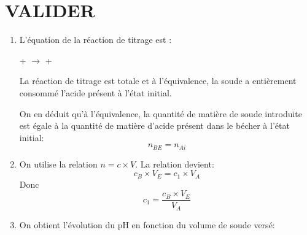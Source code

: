 \documentclass[a4paper,10pt]{article}
\begin{document}
\section{VALIDER}
\begin{enumerate}
    \item L'équation de la réaction de titrage est :
    \begin{center}
        + $\longrightarrow$  + 
    \end{center}
    La réaction de titrage est totale et à l'équivalence, la soude a entièrement consommé l'acide présent à l'état initial.
    
    On en déduit qu'à l'équivalence, la quantité de matière de soude introduite est égale à la quantité de matière d'acide présent dans le bécher à l'état initial:
    \[
        n_{BE}=n_{Ai}
    \]
    \item On utilise la relation $n=c\times V$. La relation devient:
    \[
        c_B\times V_E=c_1\times V_A
    \]
    Donc 
    \[
        c_1=\frac{c_B\times V_E}{V_A}
    \]
    \item On obtient l'évolution du pH en fonction du volume de soude versé:
    
    \def\imagetop#1{\vtop{\null\hbox{#1}}}
\begin{tabular}{p{4cm} p{10cm}}


\end{tabular}
\end{enumerate}
\end{document}
